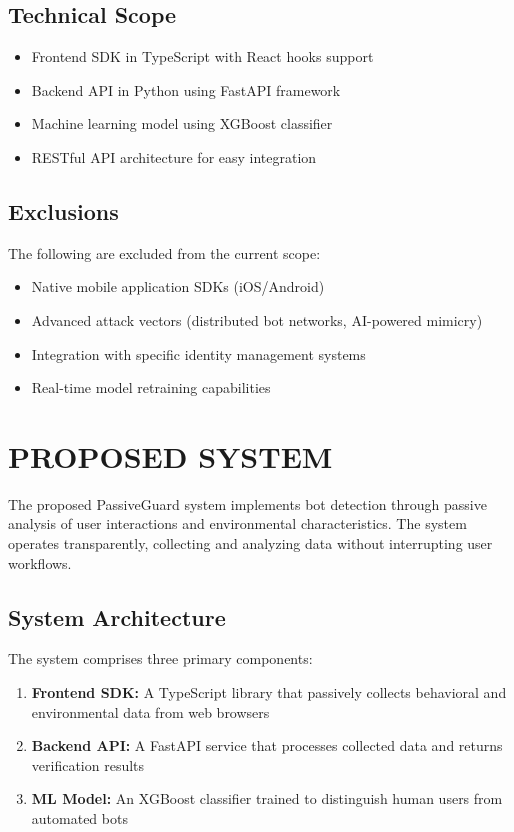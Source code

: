 \subsection{Technical Scope}

\begin{itemize}
    \item Frontend SDK in TypeScript with React hooks support
    \item Backend API in Python using FastAPI framework
    \item Machine learning model using XGBoost classifier
    \item RESTful API architecture for easy integration
\end{itemize}

\subsection{Exclusions}

The following are excluded from the current scope:
\begin{itemize}
    \item Native mobile application SDKs (iOS/Android)
    \item Advanced attack vectors (distributed bot networks, AI-powered mimicry)
    \item Integration with specific identity management systems
    \item Real-time model retraining capabilities
\end{itemize}

\section{PROPOSED SYSTEM}

The proposed PassiveGuard system implements bot detection through passive analysis of user interactions and environmental characteristics. The system operates transparently, collecting and analyzing data without interrupting user workflows.

\subsection{System Architecture}

The system comprises three primary components:

\begin{enumerate}
    \item \textbf{Frontend SDK:} A TypeScript library that passively collects behavioral and environmental data from web browsers
    \item \textbf{Backend API:} A FastAPI service that processes collected data and returns verification results
    \item \textbf{ML Model:} An XGBoost classifier trained to distinguish human users from automated bots
\end{enumerate}

